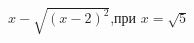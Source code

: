 \begin{ex}[type=calculate_expression]
	\begin{condition}
		\(  x-\sqrt{(x-2)^2} \),\quad при \( x=\sqrt{5} \)
	\end{condition}
\end{ex}